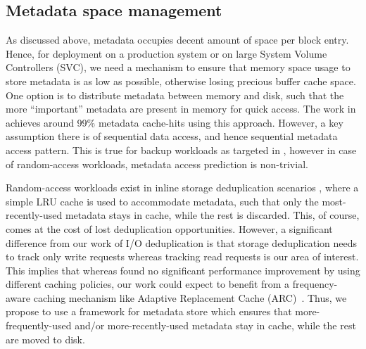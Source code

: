 \subsection{Metadata space management}
As discussed above, metadata occupies decent amount of space per block entry.
Hence, for deployment on a production system or on large System Volume
Controllers (SVC), we need a 
mechanism to ensure that memory space usage to store metadata is as low
as possible, otherwise losing precious buffer cache space. 
One option is to distribute metadata between memory and disk, such that 
the more ``important'' metadata are present in memory for quick 
access. The work in \cite{data-domain} achieves around 99\% 
metadata cache-hits using this approach. However, a key assumption 
there is of sequential data access, and hence sequential metadata access
pattern. This is true for backup workloads as targeted
in \cite{data-domain}, however in case of random-access workloads,
metadata access prediction is non-trivial.

Random-access workloads exist in inline storage deduplication scenarios
\cite{idedup}, where a simple LRU cache is used to accommodate metadata,
such that only the most-recently-used metadata stays in cache, while the
rest is discarded. This, of course, comes at the cost of lost
deduplication opportunities. However, a significant difference from our work
of I/O deduplication is that storage deduplication needs to track only 
write requests whereas tracking read requests is our area of interest. This 
implies that whereas \cite{idedup} found no significant performance 
improvement by using different caching policies, our work
could expect to benefit from a frequency-aware caching mechanism like
Adaptive Replacement Cache (ARC)~\cite{ARC, outperforming-LRU}.
Thus, we propose to use a framework for metadata store which 
ensures that more-frequently-used and/or more-recently-used
metadata stay in cache, while the rest are moved to disk. 

